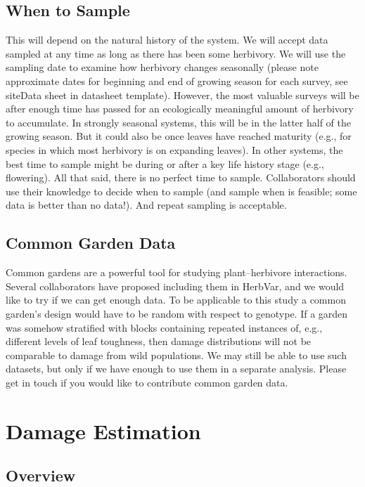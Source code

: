 \documentclass[
  letterpaper,
  DIV=11,
  numbers=noendperiod]{scrreprt}
\begin{document}
\section{When to Sample}\label{when-to-sample}

This will depend on the natural history of the system. We will accept
data sampled at any time as long as there has been some herbivory. We
will use the sampling date to examine how herbivory changes seasonally
(please note approximate dates for beginning and end of growing season
for each survey, see siteData sheet in datasheet template). However, the
most valuable surveys will be after enough time has passed for an
ecologically meaningful amount of herbivory to accumulate. In strongly
seasonal systems, this will be in the latter half of the growing season.
But it could also be once leaves have reached maturity (e.g., for
species in which most herbivory is on expanding leaves). In other
systems, the best time to sample might be during or after a key life
history stage (e.g., flowering). All that said, there is no perfect time
to sample. Collaborators should use their knowledge to decide when to
sample (and sample when is feasible; some data is better than no data!).
And repeat sampling is acceptable.

\section{Common Garden Data}\label{common-garden-data}

Common gardens are a powerful tool for studying plant--herbivore
interactions. Several collaborators have proposed including them in
HerbVar, and we would like to try if we can get enough data. To be
applicable to this study a common garden's design would have to be
random with respect to genotype. If a garden was somehow stratified with
blocks containing repeated instances of, e.g., different levels of leaf
toughness, then damage distributions will not be comparable to damage
from wild populations. We may still be able to use such datasets, but
only if we have enough to use them in a separate analysis. Please get in
touch if you would like to contribute common garden data.

\chapter{Damage Estimation}\label{sec-damage}

\section{Overview}\label{overview}
\end{document}
